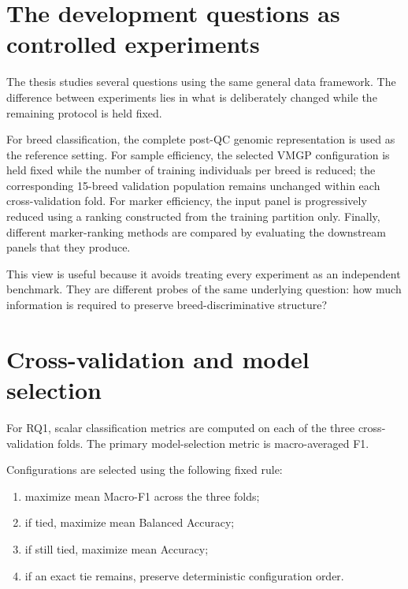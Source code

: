 \section{The development questions as controlled experiments}
\label{sec:experimental_design}

The thesis studies several questions using the same general data
framework. The difference between experiments lies in what is
deliberately changed while the remaining protocol is held fixed.

For breed classification, the complete post-QC genomic representation
is used as the reference setting. For sample efficiency, the selected
VMGP configuration is held fixed while the number of training
individuals per breed is reduced; the corresponding 15-breed
validation population remains unchanged within each cross-validation fold.
For marker efficiency, the input panel is progressively reduced using
a ranking constructed from the training partition only.
Finally, different marker-ranking methods are compared by evaluating the downstream panels that they
produce.

This view is useful because it avoids treating every experiment as an
independent benchmark. They are different probes of the same
underlying question: how much information is required to preserve
breed-discriminative structure?



\section{Cross-validation and model selection}
\label{sec:rq1_protocol}

For RQ1, scalar classification metrics are computed on each of the
three cross-validation folds. The primary model-selection metric is
macro-averaged F1.

Configurations are selected using the following fixed rule:

\begin{enumerate}
    \item maximize mean Macro-F1 across the three folds;
    \item if tied, maximize mean Balanced Accuracy;
    \item if still tied, maximize mean Accuracy;
    \item if an exact tie remains, preserve deterministic
    configuration order.
\end{enumerate}

